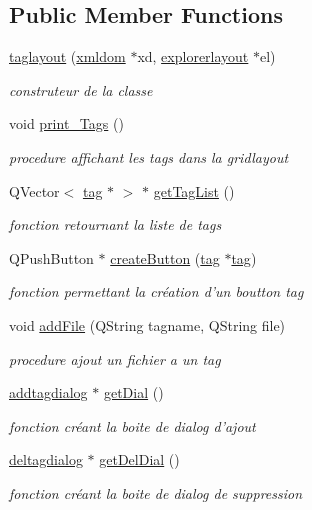 \subsection*{Public Member Functions}
\begin{DoxyCompactItemize}
\item 
\hyperlink{classtaglayout_af32701e2f0dbfabc1b39a18dc2d65aad}{taglayout} (\hyperlink{classxmldom}{xmldom} $\ast$xd, \hyperlink{classexplorerlayout}{explorerlayout} $\ast$el)
\begin{DoxyCompactList}\small\item\em construteur de la classe \end{DoxyCompactList}\item 
\hypertarget{classtaglayout_af06d79cca2f358f06b47f335e95b1f63}{void \hyperlink{classtaglayout_af06d79cca2f358f06b47f335e95b1f63}{print\-\_\-\-Tags} ()}\label{classtaglayout_af06d79cca2f358f06b47f335e95b1f63}

\begin{DoxyCompactList}\small\item\em procedure affichant les tags dans la gridlayout \end{DoxyCompactList}\item 
Q\-Vector$<$ \hyperlink{classtag}{tag} $\ast$ $>$ $\ast$ \hyperlink{classtaglayout_a2e520044d1382d8327e1f952fc39558f}{get\-Tag\-List} ()
\begin{DoxyCompactList}\small\item\em fonction retournant la liste de tags \end{DoxyCompactList}\item 
Q\-Push\-Button $\ast$ \hyperlink{classtaglayout_a27c1f97e87c8ce6694b4069ef74183b6}{create\-Button} (\hyperlink{classtag}{tag} $\ast$\hyperlink{classtag}{tag})
\begin{DoxyCompactList}\small\item\em fonction permettant la création d'un boutton tag \end{DoxyCompactList}\item 
void \hyperlink{classtaglayout_a716e94f88343dc876375072f58e1b2d1}{add\-File} (Q\-String tagname, Q\-String file)
\begin{DoxyCompactList}\small\item\em procedure ajout un fichier a un tag \end{DoxyCompactList}\item 
\hyperlink{classaddtagdialog}{addtagdialog} $\ast$ \hyperlink{classtaglayout_a0e5bf2b22dd7cb27017d7e40020bf081}{get\-Dial} ()
\begin{DoxyCompactList}\small\item\em fonction créant la boite de dialog d'ajout \end{DoxyCompactList}\item 
\hyperlink{classdeltagdialog}{deltagdialog} $\ast$ \hyperlink{classtaglayout_a883465cdf9cedbde062f2ba60808a7fd}{get\-Del\-Dial} ()
\begin{DoxyCompactList}\small\item\em fonction créant la boite de dialog de suppression \end{DoxyCompactList}\end{DoxyCompactItemize}


